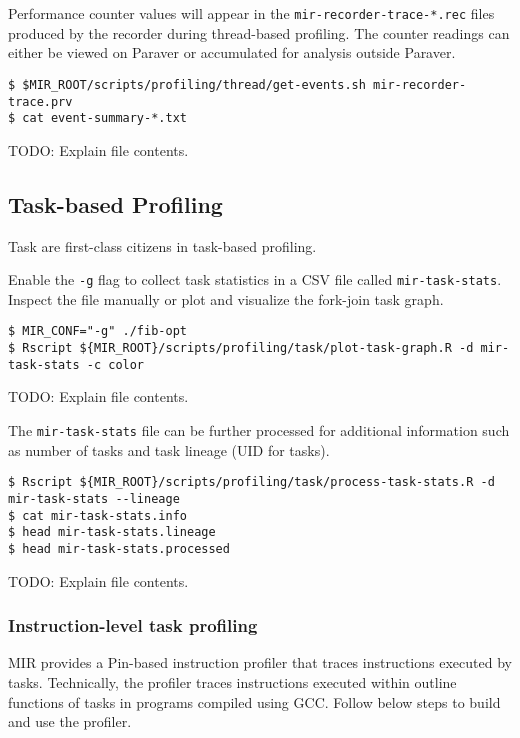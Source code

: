 \documentclass[11pt,a4paper]{article}
\begin{document}
Performance counter values will appear in the \lstinline!mir-recorder-trace-*.rec! files produced by the recorder during thread-based profiling. The counter readings can either be viewed on Paraver or accumulated for analysis outside Paraver.

\begin{lstlisting}[style=MyInputStyle]
$ $MIR_ROOT/scripts/profiling/thread/get-events.sh mir-recorder-trace.prv
$ cat event-summary-*.txt
\end{lstlisting}

TODO: Explain file contents.

\subsection{Task-based Profiling}\label{task-based-profiling}

Task are first-class citizens in task-based profiling.

Enable the \lstinline!-g! flag to collect task statistics in a CSV file called \lstinline!mir-task-stats!. Inspect the file manually or plot and visualize the fork-join task graph.

\begin{lstlisting}[style=MyInputStyle]
$ MIR_CONF="-g" ./fib-opt
$ Rscript ${MIR_ROOT}/scripts/profiling/task/plot-task-graph.R -d mir-task-stats -c color
\end{lstlisting}

TODO: Explain file contents.

The \lstinline!mir-task-stats! file can be further processed for additional information such as number of tasks and task lineage (UID for tasks).

\begin{lstlisting}[style=MyInputStyle]
$ Rscript ${MIR_ROOT}/scripts/profiling/task/process-task-stats.R -d mir-task-stats --lineage
$ cat mir-task-stats.info
$ head mir-task-stats.lineage
$ head mir-task-stats.processed
\end{lstlisting}

TODO: Explain file contents.

\subsubsection{Instruction-level task profiling}\label{instruction-level-task-profiling}

MIR provides a Pin-based instruction profiler that traces instructions executed by tasks. Technically, the profiler traces instructions executed within outline functions of tasks in programs compiled using GCC. Follow below steps to build and use the profiler.
\end{document}
